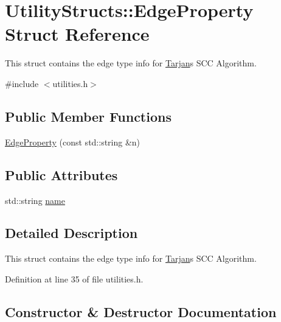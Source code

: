 \hypertarget{struct_utility_structs_1_1_edge_property}{}\section{Utility\+Structs\+:\+:Edge\+Property Struct Reference}
\label{struct_utility_structs_1_1_edge_property}


This struct contains the edge type info for \hyperlink{class_tarjan}{Tarjan}\textquotesingle{}s S\+CC Algorithm.  




{\ttfamily \#include $<$utilities.\+h$>$}

\subsection*{Public Member Functions}
\begin{DoxyCompactItemize}
\item 
\hyperlink{struct_utility_structs_1_1_edge_property_a823e9fa8af1aba8278c8c06f67e70073}{Edge\+Property} (const std\+::string \&n)
\end{DoxyCompactItemize}
\subsection*{Public Attributes}
\begin{DoxyCompactItemize}
\item 
std\+::string \hyperlink{struct_utility_structs_1_1_edge_property_a0701d898f719b1efbf795d80f503de81}{name}
\end{DoxyCompactItemize}


\subsection{Detailed Description}
This struct contains the edge type info for \hyperlink{class_tarjan}{Tarjan}\textquotesingle{}s S\+CC Algorithm. 

Definition at line 35 of file utilities.\+h.



\subsection{Constructor \& Destructor Documentation}
\mbox{\label{struct_utility_structs_1_1_edge_property_a823e9fa8af1aba8278c8c06f67e70073}} 
